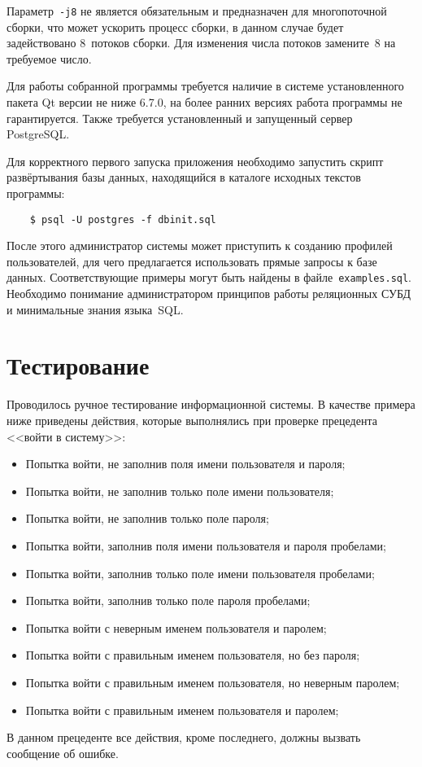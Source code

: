 Параметр~\texttt{-j8} не является обязательным и предназначен для 
многопоточной сборки, что может ускорить процесс сборки, 
в данном случае будет задействовано 8~потоков сборки. Для изменения числа
потоков замените~8 на требуемое число.

Для работы собранной программы требуется наличие в системе
установленного пакета Qt версии не ниже 6.7.0, на более ранних
версиях работа программы не гарантируется. Также требуется
установленный и запущенный сервер PostgreSQL.

Для корректного первого запуска приложения необходимо запустить 
скрипт развёртывания базы данных, находящийся
в каталоге исходных текстов программы:

\begin{lstlisting}
    $ psql -U postgres -f dbinit.sql 
\end{lstlisting}

После этого администратор системы может приступить к 
созданию профилей пользователей, для чего предлагается 
использовать прямые запросы к базе данных. 
Соответствующие примеры могут быть найдены в файле~\texttt{examples.sql}. 
Необходимо понимание администратором принципов работы 
реляционных СУБД и минимальные знания языка~SQL.


\section{Тестирование}
Проводилось ручное тестирование информационной системы. В качестве 
примера ниже приведены действия, которые выполнялись при проверке 
прецедента <<войти в систему>>:
\begin{itemize}
    \item Попытка войти, не заполнив поля имени пользователя и пароля;
    \item Попытка войти, не заполнив только поле имени пользователя;
    \item Попытка войти, не заполнив только поле пароля;
    \item Попытка войти, заполнив поля имени пользователя и пароля пробелами;
    \item Попытка войти, заполнив только поле имени пользователя пробелами;
    \item Попытка войти, заполнив только поле пароля пробелами;
    \item Попытка войти с неверным именем пользователя и паролем;
    \item Попытка войти с правильным именем пользователя, но без пароля;
    \item Попытка войти с правильным именем пользователя, но неверным паролем;
    \item Попытка войти с правильным именем пользователя и паролем;
\end{itemize}
В данном прецеденте все действия, кроме последнего, должны
вызвать сообщение об ошибке.


